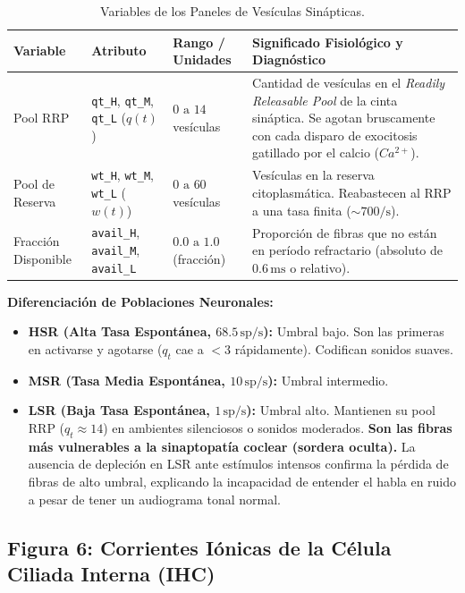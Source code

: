 \documentclass[12pt,a4paper]{article}
\begin{document}
\begin{table}[H]
\centering
\caption{Variables de los Paneles de Vesículas Sinápticas.}
\begin{tabularx}{\textwidth}{>{\raggedright\arraybackslash}p{3.0cm} >{\raggedright\arraybackslash}p{3.4cm} >{\raggedright\arraybackslash}p{2.8cm} X}
\toprule
\textbf{Variable} & \textbf{Atributo} & \textbf{Rango / Unidades} & \textbf{Significado Fisiológico y Diagnóstico} \\
\midrule
Pool RRP & \texttt{qt\_H}, \texttt{qt\_M}, \texttt{qt\_L} ($q(t)$) & $0 \text{ a } 14$ vesículas & Cantidad de vesículas en el \emph{Readily Releasable Pool} de la cinta sináptica. Se agotan bruscamente con cada disparo de exocitosis gatillado por el calcio ($Ca^{2+}$). \\
Pool de Reserva & \texttt{wt\_H}, \texttt{wt\_M}, \texttt{wt\_L} ($w(t)$) & $0 \text{ a } 60$ vesículas & Vesículas en la reserva citoplasmática. Reabastecen al RRP a una tasa finita ($\sim 700/\text{s}$). \\
Fracción Disponible & \texttt{avail\_H}, \texttt{avail\_M}, \texttt{avail\_L} & $0.0 \text{ a } 1.0$ (fracción) & Proporción de fibras que no están en período refractario (absoluto de $0.6\,\text{ms}$ o relativo). \\
\bottomrule
\end{tabularx}
\end{table}

\textbf{Diferenciación de Poblaciones Neuronales:}
\begin{itemize}
    \item \textbf{HSR (Alta Tasa Espontánea, $68.5\,\text{sp/s}$):} Umbral bajo. Son las primeras en activarse y agotarse ($q_t$ cae a $<3$ rápidamente). Codifican sonidos suaves.
    \item \textbf{MSR (Tasa Media Espontánea, $10\,\text{sp/s}$):} Umbral intermedio.
    \item \textbf{LSR (Baja Tasa Espontánea, $1\,\text{sp/s}$):} Umbral alto. Mantienen su pool RRP ($q_t \approx 14$) en ambientes silenciosos o sonidos moderados. \textbf{Son las fibras más vulnerables a la sinaptopatía coclear (sordera oculta).} La ausencia de depleción en LSR ante estímulos intensos confirma la pérdida de fibras de alto umbral, explicando la incapacidad de entender el habla en ruido a pesar de tener un audiograma tonal normal.
\end{itemize}

\subsection{Figura 6: Corrientes Iónicas de la Célula Ciliada Interna (IHC)}
\end{document}
